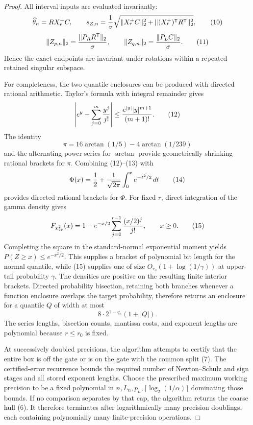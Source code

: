 \documentclass{article}
\begin{document}
\begin{proof}
All interval inputs are evaluated invariantly:
\[
\widehat\theta_n=RX_r^+C,
\qquad
s_{Z,n}={1\over\sigma}
\sqrt{\|X_r^+C\|_2^2+
\|(X_r^+)^{\mathsf T}R^{\mathsf T}\|_2^2},                            \tag{10}
\]
\[
\|Z_{p,n}\|_2={\|P_RR^{\mathsf T}\|_2\over\sigma},
\qquad
\|Z_{q,n}\|_2={\|P_LC\|_2\over\sigma}.                             \tag{11}
\]
Hence the exact endpoints are invariant under rotations within a repeated
retained singular subspace.

For completeness, the two quantile enclosures can be produced with directed
rational arithmetic.  Taylor's formula with integral remainder gives
\[
\left|e^y-\sum_{j=0}^m{y^j\over j!}\right|
\le {e^{|y|}|y|^{m+1}\over(m+1)!}.                                   \tag{12}
\]
The identity
\[
\pi=16\arctan(1/5)-4\arctan(1/239)                                  \tag{13}
\]
and the alternating power series for \(\arctan\) provide geometrically
shrinking rational brackets for \(\pi\).  Combining (12)--(13) with
\[
\Phi(x)=\frac12+{1\over\sqrt{2\pi}}
\int_0^x e^{-t^2/2}\,dt                                             \tag{14}
\]
provides directed rational brackets for \(\Phi\).  For fixed \(r\), direct
integration of the gamma density gives
\[
F_{\chi^2_{2r}}(x)
=1-e^{-x/2}\sum_{j=0}^{r-1}{(x/2)^j\over j!},\qquad x\ge0.           \tag{15}
\]
Completing the square in the standard-normal exponential moment yields
\(P(Z\ge x)\le e^{-x^2/2}\).  This supplies a bracket of polynomial bit length
for the normal quantile, while (15) supplies one of size
\(O_{r_0}(1+\log(1/\gamma))\) at upper-tail probability \(\gamma\).  The
densities are positive on the resulting finite interior brackets.  Directed
probability bisection, retaining both branches whenever a function enclosure
overlaps the target probability, therefore returns an enclosure for a quantile
\(Q\) of width at most
\[
8\cdot2^{1-q_n}(1+|Q|).                                               \tag{16}
\]
The series lengths, bisection counts, mantissa costs, and exponent lengths are
polynomial because \(r\le r_0\) is fixed.

At successively doubled precisions, the algorithm attempts to certify that the
entire box is off the gate or is on the gate with the common split (7).  The
certified-error recurrence bounds the required number of Newton--Schulz and sign
stages and all stored exponent lengths.  Choose the prescribed maximum working
precision to be a fixed polynomial in
\(n,L_n,p_n,\lceil\log_2(1/\alpha)\rceil\) dominating those bounds.  If no
comparison separates by that cap, the algorithm returns the coarse hull (6).
It therefore terminates after logarithmically many precision doublings, each
containing polynomially many finite-precision operations.


\end{proof}
\end{document}
